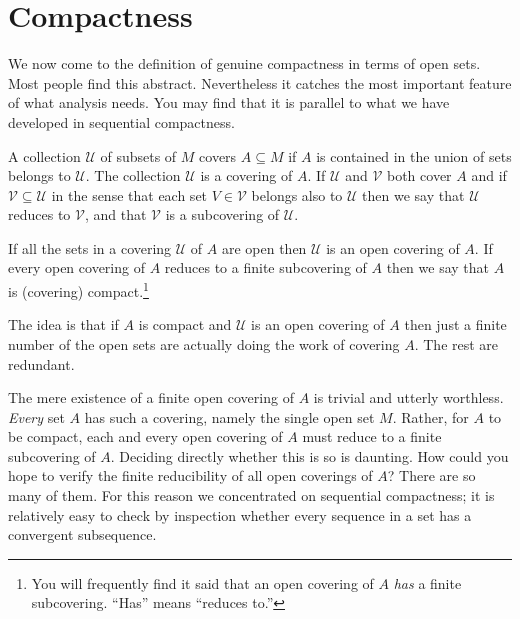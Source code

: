 \section{Compactness}
\label{sec:covering-comp}

We now come to the definition of genuine compactness in terms of open sets.
Most people find this abstract.
Nevertheless it catches the most important feature of what analysis needs.
You may find that it is parallel to what we have developed in sequential compactness.

\begin{defn}
  A collection $\mathcal U$ of subsets of $M$ \textsf{covers} $A \subseteq M$ if $A$ is contained in the union of sets belongs to $\mathcal{U}$.
  The collection $\mathcal{U}$ is a \textsf{covering} of $A$.
  If $\mathcal{U}$ and $\mathcal{V}$ both cover $A$ and if $\mathcal{V} \subseteq \mathcal{U}$ in the sense that each set $V \in \mathcal{V}$ belongs also to $\mathcal{U}$ then we say that $\mathcal{U}$ \textsf{reduces} to $\mathcal{V}$, and that $\mathcal{V}$ is a \textsf{subcovering} of $\mathcal{U}$.
\end{defn}

\begin{defn}
  If all the sets in a covering $\mathcal{U}$ of $A$ are open then $\mathcal{U}$ is an \textsf{open covering} of $A$.
  If every open covering of $A$ reduces to a finite subcovering of $A$ then we say that $A$ is \textsf{(covering) compact}.\footnote{You will frequently find it said that an open covering of $A$ \textit{has} a finite subcovering.  ``Has'' means ``reduces to.''}
\end{defn}

The idea is that if $A$ is compact and $\mathcal{U}$ is an open covering of $A$ then just a finite number of the open sets are actually doing the work of covering $A$.
The rest are redundant.

The mere existence of a finite open covering of $A$ is trivial and utterly worthless.
{\em Every} set $A$ has such a covering, namely the single open set $M$.
Rather, for $A$ to be compact, each and every open covering of $A$ must reduce to a finite subcovering of $A$.
Deciding directly whether this is so is daunting. 
How could you hope to verify the finite reducibility of all open coverings of $A$? 
There are so many of them. 
For this reason we concentrated on sequential compactness; it is relatively easy to check by inspection whether every sequence in a set has a convergent subsequence.

